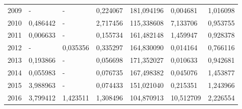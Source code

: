 \begin{table}
\begin{tabular}{p{1cm}p{2cm}p{2cm}p{2cm}p{2cm}p{2cm}p{2cm}}
 2009 &                                - &                    - &                             0,224067 &                     181,094196 &                    0,004681 &                                  1,016098 \\
 2010 &                         0,486442 &                    - &                             2,717456 &                     115,338608 &                    7,133706 &                                  0,953755 \\
 2011 &                         0,006633 &                    - &                             0,155734 &                     161,482148 &                    1,459947 &                                  0,928378 \\
 2012 &                                - &             0,035356 &                             0,335297 &                     164,830090 &                    0,014164 &                                  0,766116 \\
 2013 &                         0,193866 &                    - &                             0,056698 &                     171,352027 &                    0,010633 &                                  0,942681 \\
 2014 &                         0,055983 &                    - &                             0,076735 &                     167,498382 &                    0,045076 &                                  1,453877 \\
 2015 &                         3,988963 &                    - &                             0,074433 &                     151,021040 &                    0,215351 &                                  1,243966 \\
 2016 &                         3,799412 &             1,423511 &                             1,308496 &                     104,870913 &                   10,512709 &                                  2,226554 \\
\bottomrule
\end{tabular}
\end{table}
